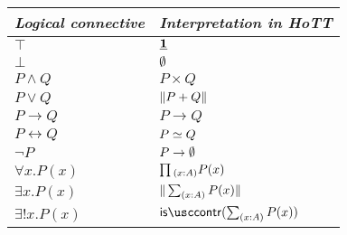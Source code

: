 \begin{center}
\begin{tabular}{ll}
\toprule
\emph{Logical connective} & \emph{Interpretation in HoTT} \\
\midrule
$\top$ & $\underline{\mathbf{1}}$ \\
$\bot$ & $\emptyset$ \\
$P\land Q$ & $P\times Q$ \\
$P\lor Q$ & $\Vert P+Q\Vert_{}$ \\
$P\to Q$ & $P\to Q$ \\
$P\leftrightarrow Q$ & $\eqv{P}{Q}$ \\
$\neg P$ & $P\to\emptyset$ \\
$\forall x.P(x)$ & $\prd{x:A}P(x)$ \\
$\exists x.P(x)$ & $\brck{\sm{x:A}P(x)}$ \\
$\exists! x.P(x)$ & $\iscontr(\sm{x:A}P(x))$ \\
\bottomrule
\end{tabular}
\end{center}

